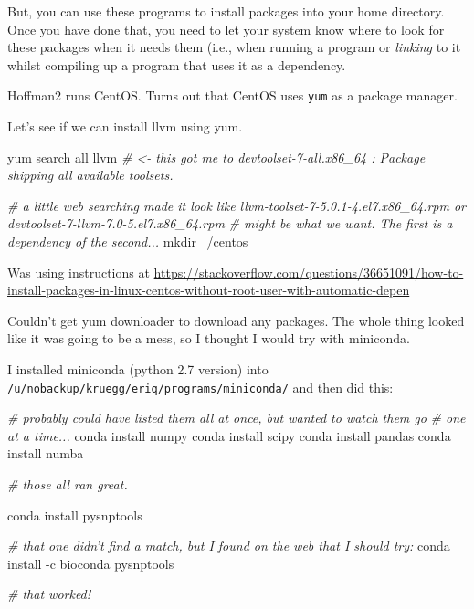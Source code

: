 \documentclass[]{krantz}
\makeatletter
\newenvironment{Shaded}{\begin{snugshade}}{\end{snugshade}}
\newcommand{\CommentTok}[1]{\textcolor[rgb]{0.37,0.37,0.37}{\textit{#1}}}
\newcommand{\ExtensionTok}[1]{#1}
\newcommand{\FunctionTok}[1]{\textcolor[rgb]{0,0,0}{#1}}
\newcommand{\NormalTok}[1]{#1}
\newenvironment{kframe}{%
\medskip{}
\setlength{\fboxsep}{.8em}
 \def\at@end@of@kframe{}%
 \ifinner\ifhmode%
  \def\at@end@of@kframe{\end{minipage}}%
  \begin{minipage}{\columnwidth}%
 \fi\fi%
 \def\FrameCommand##1{\hskip\@totalleftmargin \hskip-\fboxsep
 \colorbox{shadecolor}{##1}\hskip-\fboxsep
     \hskip-\linewidth \hskip-\@totalleftmargin \hskip\columnwidth}%
 \MakeFramed {\advance\hsize-\width
   \@totalleftmargin\z@ \linewidth\hsize
   \@setminipage}}%
 {\par\unskip\endMakeFramed%
 \at@end@of@kframe}
\renewenvironment{Shaded}{\begin{kframe}}{\end{kframe}}
\makeatother
\begin{document}
But, you can use these programs to install packages into your home directory. Once you have done
that, you need to let your system know where to look for these packages when it needs them
(i.e., when running a program or \emph{linking} to it whilst compiling up a program that uses it
as a dependency.

Hoffman2 runs CentOS. Turns out that CentOS uses \texttt{yum} as a package manager.

Let's see if we can install llvm using yum.

\begin{Shaded}
\begin{Highlighting}[]
\ExtensionTok{yum}\NormalTok{ search all llvm }\CommentTok{# <- this got me to devtoolset-7-all.x86_64 : Package shipping all available toolsets.}

\CommentTok{# a little web searching made it look like llvm-toolset-7-5.0.1-4.el7.x86_64.rpm or devtoolset-7-llvm-7.0-5.el7.x86_64.rpm}
\CommentTok{# might be what we want.  The first is a dependency of the second...}
\FunctionTok{mkdir}\NormalTok{ ~/centos}
\end{Highlighting}
\end{Shaded}

Was using instructions at \url{https://stackoverflow.com/questions/36651091/how-to-install-packages-in-linux-centos-without-root-user-with-automatic-depen}

Couldn't get yum downloader to download any packages. The whole thing looked like it was going to
be a mess, so I thought I would try with miniconda.

I installed miniconda (python 2.7 version) into \texttt{/u/nobackup/kruegg/eriq/programs/miniconda/} and then did this:

\begin{Shaded}
\begin{Highlighting}[]
\CommentTok{# probably could have listed them all at once, but wanted to watch them go }
\CommentTok{# one at a time...}
\ExtensionTok{conda}\NormalTok{ install numpy}
\ExtensionTok{conda}\NormalTok{ install scipy}
\ExtensionTok{conda}\NormalTok{ install pandas}
\ExtensionTok{conda}\NormalTok{ install numba}

\CommentTok{# those all ran great.}

\ExtensionTok{conda}\NormalTok{ install pysnptools}

\CommentTok{# that one didn't find a match, but I found on the web that I should try:}
\ExtensionTok{conda}\NormalTok{ install -c bioconda pysnptools }

\CommentTok{# that worked!}
\end{Highlighting}
\end{Shaded}
\end{document}

